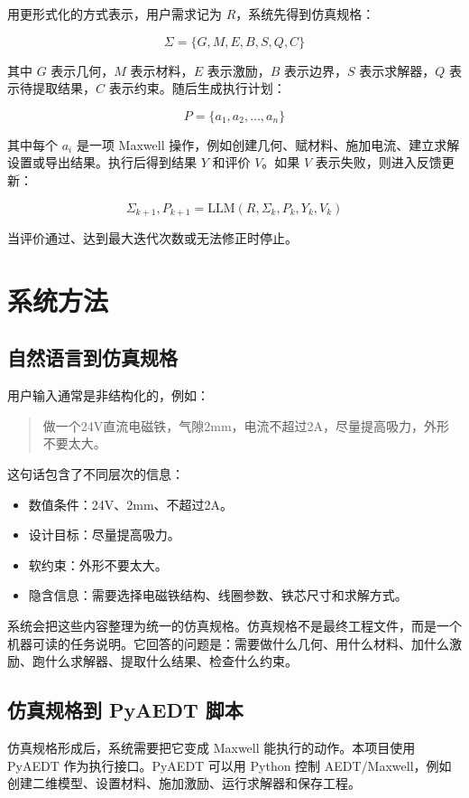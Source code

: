 \documentclass[12pt,a4paper]{ctexart}
\begin{document}
用更形式化的方式表示，用户需求记为 $R$，系统先得到仿真规格：

\[
\Sigma = \{G, M, E, B, S, Q, C\}
\]

其中 $G$ 表示几何，$M$ 表示材料，$E$ 表示激励，$B$ 表示边界，$S$ 表示求解器，$Q$ 表示待提取结果，$C$ 表示约束。随后生成执行计划：

\[
P = \{a_1, a_2, \ldots, a_n\}
\]

其中每个 $a_i$ 是一项 Maxwell 操作，例如创建几何、赋材料、施加电流、建立求解设置或导出结果。执行后得到结果 $Y$ 和评价 $V$。如果 $V$ 表示失败，则进入反馈更新：

\[
\Sigma_{k+1}, P_{k+1} = \mathrm{LLM}(R, \Sigma_k, P_k, Y_k, V_k)
\]

当评价通过、达到最大迭代次数或无法修正时停止。

\section{系统方法}

\subsection{自然语言到仿真规格}

用户输入通常是非结构化的，例如：

\begin{quote}
做一个24V直流电磁铁，气隙2mm，电流不超过2A，尽量提高吸力，外形不要太大。
\end{quote}

这句话包含了不同层次的信息：

\begin{itemize}
  \item 数值条件：24V、2mm、不超过2A。
  \item 设计目标：尽量提高吸力。
  \item 软约束：外形不要太大。
  \item 隐含信息：需要选择电磁铁结构、线圈参数、铁芯尺寸和求解方式。
\end{itemize}

系统会把这些内容整理为统一的仿真规格。仿真规格不是最终工程文件，而是一个机器可读的任务说明。它回答的问题是：需要做什么几何、用什么材料、加什么激励、跑什么求解器、提取什么结果、检查什么约束。

\subsection{仿真规格到 PyAEDT 脚本}

仿真规格形成后，系统需要把它变成 Maxwell 能执行的动作。本项目使用 PyAEDT 作为执行接口。PyAEDT 可以用 Python 控制 AEDT/Maxwell，例如创建二维模型、设置材料、施加激励、运行求解器和保存工程。
\end{document}
